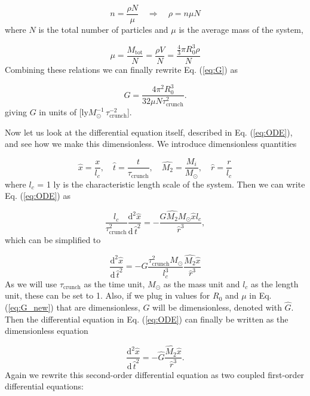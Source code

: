\documentclass{article}
\begin{document}
\begin{multicols}{2}
\begin{equation*}
	n = \frac{\rho N}{\mu} \quad \Rightarrow \quad \rho = n \mu N
\end{equation*}
where $N$ is the total number of particles and $\mu$ is the average mass of the system,

\begin{equation*}
	\mu = \frac{M_{\mathrm{tot}}}{N} = \frac{\rho V}{N} = \frac{\frac{4}{3} \pi R_0^3 \rho}{N}
\end{equation*}
Combining these relations we can finally rewrite Eq. (\ref{eq:G}) as 

\begin{equation}\label{eq:G_new}
	G = \frac{4 \pi^2 R_0^3}{32 \mu N \tau_{\mathrm{crunch}}^2}.
\end{equation}
giving $G$ in units of [ly$M_{\odot}^{-1} \, \tau_{\mathrm{crunch}}^{-2}$].

Now let us look at the differential equation itself, described in Eq. (\ref{eq:ODE}), and see how we make this dimensionless. We introduce dimensionless quantities

\begin{equation*}
	\hat{x} = \frac{x}{l_c}, \quad \hat{t} = \frac{t}{\tau_{\mathrm{crunch}}}, \quad \hat{M_2} = \frac{M_i}{M_{\odot}}, \quad \hat{r} = \frac{r}{l_c}
\end{equation*} 
where $l_c$ = 1 ly is the characteristic length scale of the system. Then we can write Eq. (\ref{eq:ODE}) as

\begin{equation*}
	\frac{l_c}{\tau_{\mathrm{crunch}}^2} \frac{\mathrm{d}^2 \hat{x}}{\mathrm{d} \, \hat{t}^2} = - \frac{G \hat{M_2} M_{\odot} \hat{x} l_c}{\hat{r}^3},
\end{equation*}
which can be simplified to

\begin{equation*}
	\frac{\mathrm{d}^2 \hat{x}}{\mathrm{d} \, \hat{t}^2} = - G \frac{\tau_{\mathrm{crunch}}^2 M_{\odot}}{l_c^3}  \frac{\hat{M_2} \hat{x}}{\hat{r}^3}
\end{equation*}
As we will use $\tau_{\mathrm{crunch}}$ as the time unit, $M_{\odot}$ as the mass unit and $l_c$ as the length unit, these can be set to 1. Also, if we plug in values for $R_0$ and $\mu$ in Eq. (\ref{eq:G_new}) that are dimensionless, $G$ will be dimensionless, denoted with $\hat{G}$. Then the differential equation in Eq. (\ref{eq:ODE}) can finally be written as the dimensionless equation

\begin{equation}\label{eq:ODE_new}
	\frac{\mathrm{d}^2 \hat{x}}{\mathrm{d} \, \hat{t}^2} = - \hat{G} \frac{\hat{M_2} \hat{x}}{\hat{r}^3}.
\end{equation}
Again we rewrite this second-order differential equation as two coupled first-order differential equations:


\end{multicols}
\end{document}
